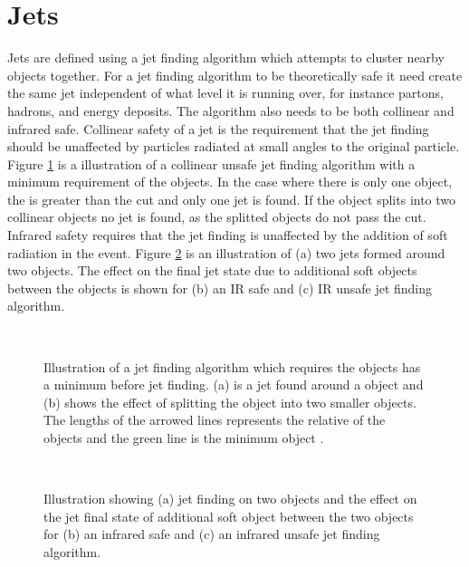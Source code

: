 \section{Jets}
\label{sec:Theory:Jets}

Jets are defined using a jet finding algorithm which attempts to cluster nearby objects together.
For a jet finding algorithm to be theoretically safe it need create the same jet independent of what level it is running over, for instance partons, hadrons, and energy deposits.
The algorithm also needs to be both collinear and infrared safe.
Collinear safety of a jet is the requirement that the jet finding should be unaffected by particles radiated at small angles to the original particle. 
Figure \ref{Theory:IR} is a illustration of a collinear unsafe jet finding algorithm with a minimum \pt{} requirement of the objects.
In the case where there is only one object, the \pt{} is  greater than the \pt{} cut and only one jet is found. 
If the object splits into two collinear objects no jet is found, as the splitted objects do not pass the \pt{} cut.
Infrared safety requires that the jet finding is unaffected by the addition of soft radiation in the event.  
Figure \ref{Theory:Collinear} is an illustration of (a) two jets formed around two objects. 
The effect on the final jet state due to additional soft objects between the objects is shown for (b) an IR safe and (c) IR unsafe jet finding algorithm.


\begin{figure}
\centering
\mbox{
              \quad
              \quad
                              }
\caption[]{
Illustration of a jet finding algorithm which requires the objects has a minimum \pt{} before jet finding. 
(a) is a jet found around a object and (b) shows the effect of splitting the object into two smaller objects.
The lengths of the arrowed lines represents the relative \pt{} of the objects and the green line is the minimum object \pt{}.
\label{Theory:IR}}
\end{figure}

\begin{figure}
\centering
\mbox{
              \quad
              \quad
              \quad
                              }
\caption[]{
Illustration showing (a) jet finding on two objects and the effect on the jet final state of additional soft object between the two objects for (b) an infrared safe and (c) an infrared unsafe jet finding algorithm. 
\label{Theory:Collinear}}
\end{figure}


